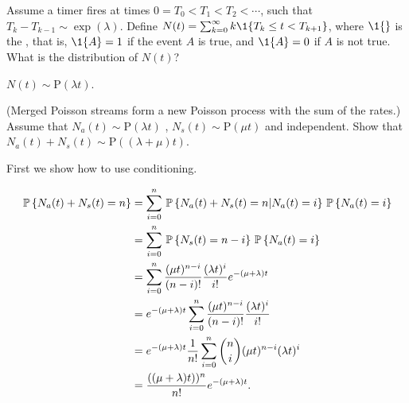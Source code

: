 \begin{question}
  Assume a timer fires at times $0=T_0<T_1<T_2< \cdots$, such that
  $T_{k}-T_{k-1}\sim\exp(\lambda)$. Define
  $N(t) = \sum_{k=0}^\infty k \1{T_k \leq t < T_{k+1}}$, where $\1{}$
  is the , that is, $\1{A}=1$ if the event
  $A$ is true, and $\1{A}=0$ if $A$ is not true. What is the
  distribution of $N(t)$?
\begin{solution}
$N(t) \sim \text{P}(\lambda t)$. 
\end{solution}
\end{question}


\begin{question} (Merged Poisson streams form a new Poisson process
  with the sum of the rates.) Assume that
  $N_a(t)\sim \text{P}(\lambda t)$ , $N_s(t) \sim \text{P}(\mu t)$ and
  independent.  Show that
  $N_a(t) + N_s(t) \sim \text{P}((\lambda + \mu)t)$.  


    \begin{solution}
First we show how to  use conditioning. 


  \begin{equation*}
    \begin{split}
\P{N_a(t) + N_s(t) = n} 
&= \sum_{i=0}^n \P{N_a(t) + N_s(t) = n|N_a(t) = i}\P{N_a(t)=i} \\
&= \sum_{i=0}^n \P{ N_s(t) = n-i}\P{N_a(t)=i} \\
&= \sum_{i=0}^n \frac{(\mu t)^{n-i}}{(n-i)!} \frac{(\lambda t)^i}{i!} e^{-(\mu+\lambda)t} \\
&= e^{-(\mu+\lambda)t} \sum_{i=0}^n \frac{(\mu t)^{n-i}}{(n-i)!} \frac{(\lambda t)^i}{i!}  \\
&= e^{-(\mu+\lambda)t}\frac 1{n!} \sum_{i=0}^n {n \choose i }(\mu t)^{n-i}(\lambda t)^i  \\
&= \frac{((\mu+\lambda)t))^n}{n!}e^{-(\mu+\lambda)t}.
    \end{split}
  \end{equation*}


\end{solution}
\end{question}
